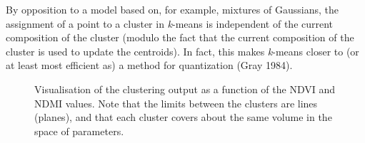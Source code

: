 \documentclass[
  letterpaper,
]{scrbook}
\begin{document}
By opposition to a model based on, for example, mixtures of Gaussians,
the assignment of a point to a cluster in \emph{k}-means is independent
of the current composition of the cluster (modulo the fact that the
current composition of the cluster is used to update the centroids). In
fact, this makes \emph{k}-means closer to (or at least most efficient
as) a method for quantization (Gray 1984).

\begin{figure}[pbt]


\caption{\label{fig-kmeans-clustering}Visualisation of the clustering
output as a function of the NDVI and NDMI values. Note that the limits
between the clusters are lines (planes), and that each cluster covers
about the same volume in the space of parameters.}

\end{figure}%
\end{document}
